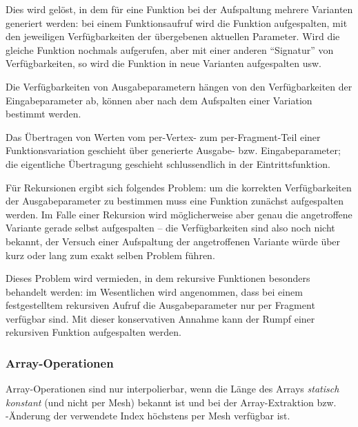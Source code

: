 \documentclass[twoside,a4paper,fleqn,12pt]{book}
\begin{document}
Dies wird gelöst, in dem für eine Funktion bei der Aufspaltung mehrere Varianten generiert werden: bei einem Funktionsaufruf
wird die Funktion aufgespalten, mit den jeweiligen Verfügbarkeiten der übergebenen aktuellen Parameter. Wird die gleiche Funktion
nochmals aufgerufen, aber mit einer anderen "`Signatur"' von Verfügbarkeiten, so wird die Funktion in neue Varianten aufgespalten usw.

Die Verfügbarkeiten von Ausgabeparametern hängen von den Verfügbarkeiten der Eingabeparameter ab, können aber nach dem Aufspalten
einer Variation bestimmt werden.

Das Übertragen von Werten vom per-Vertex- zum per-Fragment-Teil einer Funktionsvariation geschieht über generierte Ausgabe- bzw.
Eingabeparameter; die eigentliche Übertragung geschieht schlussendlich in der Eintrittsfunktion.

Für Rekursionen ergibt sich folgendes Problem:
um die korrekten Verfügbarkeiten der Ausgabeparameter zu bestimmen
muss eine Funktion zunächst aufgespalten werden. Im Falle einer Rekursion wird möglicherweise aber genau die angetroffene
Variante gerade selbst aufgespalten -- die Verfügbarkeiten sind also noch nicht bekannt, der Versuch einer Aufspaltung der
angetroffenen Variante würde über kurz oder lang zum exakt selben Problem führen.

Dieses Problem wird vermieden, in dem rekursive Funktionen besonders behandelt werden: im Wesentlichen wird angenommen,
dass bei einem festgestelltem rekursiven Aufruf die Ausgabeparameter nur per Fragment verfügbar sind.
Mit dieser konservativen Annahme kann der Rumpf einer rekursiven Funktion aufgespalten werden.



% 

\subsubsection{Array-Operationen}

Array-Operationen sind nur interpolierbar, wenn die Länge des Arrays \emph{statisch konstant}
(und nicht per Mesh) bekannt ist und bei der Array-Extraktion bzw. \mbox{-Än}\-de\-rung der verwendete Index höchstens per Mesh
verfügbar ist.
\end{document}
